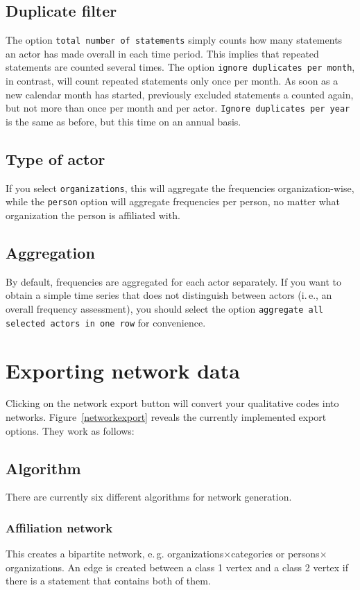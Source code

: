 \documentclass[12pt,a4paper]{scrreprt}
\newcommand{\code}[1]{\texttt{#1}}
\begin{document}
\subsection{Duplicate filter}
The option \code{total number of statements} simply counts how many statements an actor has made overall in each time period. This implies that repeated statements are counted several times. The option \code{ignore duplicates per month}, in contrast, will count repeated statements only once per month. As soon as a new calendar month has started, previously excluded statements a counted again, but not more than once per month and per actor. \code{Ignore duplicates per year} is the same as before, but this time on an annual basis.

\subsection{Type of actor}
If you select \code{organizations}, this will aggregate the frequencies organization-wise, while the \code{person} option will aggregate frequencies per person, no matter what organization the person is affiliated with.

\subsection{Aggregation}
By default, frequencies are aggregated for each actor separately. If you want to obtain a simple time series that does not distinguish between actors (i.\,e., an overall frequency assessment), you should select the option \code{aggregate all selected actors in one row} for convenience.

\section{Exporting network data}\label{network}
Clicking on the network export button will convert your qualitative codes into networks. Figure~\ref{networkexport} reveals the currently implemented export options. They work as follows:

\subsection{Algorithm}\label{algorithm}
There are currently six different algorithms for network generation.

\subsubsection{Affiliation network}
This creates a bipartite network, e.\,g. organizations$\times$catego\-ries or per\-sons$\times$or\-ga\-ni\-za\-tions. An edge is created between a class 1 vertex and a class 2 vertex if there is a statement that contains both of them.
\end{document}
